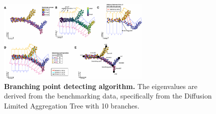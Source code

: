 \begin{figure}[!ht]
    \centering
    \includegraphics[width=0.65\textwidth]{branching/fig}
    \vspace{0.1cm}
    \caption[Branching point detecting algorithm.]{\textbf{Branching point detecting algorithm.} The eigenvalues are derived from the benchmarking data, specifically from the Diffusion Limited Aggregation Tree with 10 branches.}
    \label{fig:breakingpoint}
\end{figure}


